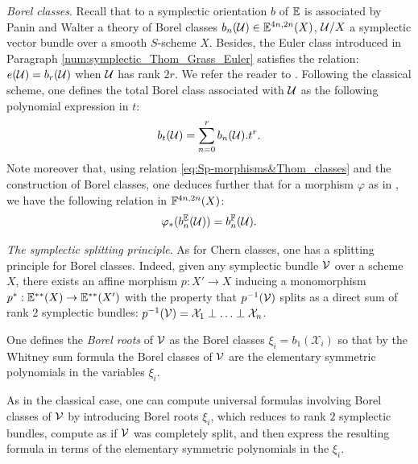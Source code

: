 \begin{num}\textit{Borel classes}. \label{num:Borel_Sp}
Recall that to a symplectic orientation $b$ of $\mathbb E$ is associated by Panin and Walter
 a theory of Borel classes $b_n(\mathcal U) \in \mathbb E^{4n,2n}(X)$, $\mathcal U/X$ a symplectic vector bundle
 over a smooth $S$-scheme $X$. Besides, the Euler class introduced in Paragraph
 \ref{num:symplectic_Thom_Grass_Euler}
 satisfies the relation: $e(\mathcal U)=b_r(\mathcal U)$ when $\mathcal U$ has rank $2r$.
 We refer the reader to \cite[Section 2.2]{DF3}.
 Following the classical scheme, one defines the total Borel class associated with
 $\mathcal U$ as the following polynomial expression in $t$:
\begin{equation}\label{eq:total_borel}
b_t(\mathcal U)=\sum_{n=0}^r b_n(\mathcal U).t^r.
\end{equation}
Note moreover that, using relation \eqref{eq:Sp-morphisms&Thom_classes} and the construction
 of Borel classes, one deduces further that for a morphism $\varphi$ as in ,
 we have the following relation in $\mathbb F^{4n,2n}(X)$:
\begin{equation}\label{eq:Sp-morphisms&Borel_classes}
\varphi_*(b_n^\mathbb E(\mathcal U))=b_n^\mathbb F(\mathcal U).
\end{equation}
\end{num}

\begin{num}\label{num:sp-splitting-principle}
\textit{The symplectic splitting principle}. As for Chern classes,
 one has a splitting principle for Borel classes.
 Indeed, given any symplectic bundle $\mathcal V$ over a scheme $X$, there exists an affine morphism $p:X' \rightarrow X$
 inducing a monomorphism $p^*:\mathbb E^{**}(X) \rightarrow \mathbb E^{**}(X')$ with the property that $p^{-1}(\mathcal V)$ splits
 as a direct sum of rank $2$ symplectic bundles: $p^{-1}(\mathcal V)=\mathcal X_1 \perp \hdots \perp \mathcal X_n$.

One defines the {\it Borel roots} of $\mathcal V$ as the Borel classes $\xi_i=b_1(\mathcal X_i)$ so that
 by the Whitney sum formula \cite[Theorem 10.5]{PWQuaternionic} the Borel classes of $\mathcal V$ are the elementary symmetric polynomials
 in the variables $\xi_i$.

As in the classical case, one can compute universal formulas involving Borel classes of $\mathcal V$ by introducing Borel roots
 $\xi_i$, which reduces to rank $2$ symplectic bundles, compute as if $\mathcal V$ was completely split, and
 then express the resulting formula in terms of
 the elementary symmetric polynomials in the $\xi_i$. %
\end{num}

